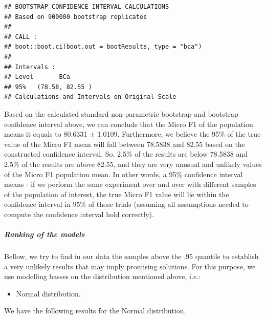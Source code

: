 \documentclass[
]{article}
\newenvironment{Shaded}{\begin{snugshade}}{\end{snugshade}}
\newcommand{\CommentTok}[1]{\textcolor[rgb]{0.56,0.35,0.01}{\textit{#1}}}
\newcommand{\DecValTok}[1]{\textcolor[rgb]{0.00,0.00,0.81}{#1}}
\newcommand{\FunctionTok}[1]{\textcolor[rgb]{0.00,0.00,0.00}{#1}}
\newcommand{\NormalTok}[1]{#1}
\newcommand{\OtherTok}[1]{\textcolor[rgb]{0.56,0.35,0.01}{#1}}
\newcommand{\SpecialCharTok}[1]{\textcolor[rgb]{0.00,0.00,0.00}{#1}}
\newcommand{\StringTok}[1]{\textcolor[rgb]{0.31,0.60,0.02}{#1}}
\providecommand{\tightlist}{%
  \setlength{\itemsep}{0pt}\setlength{\parskip}{0pt}}
\begin{document}
\begin{verbatim}
## BOOTSTRAP CONFIDENCE INTERVAL CALCULATIONS
## Based on 900000 bootstrap replicates
## 
## CALL : 
## boot::boot.ci(boot.out = bootResults, type = "bca")
## 
## Intervals : 
## Level       BCa          
## 95%   (78.58, 82.55 )  
## Calculations and Intervals on Original Scale
\end{verbatim}

Based on the calculated standard non-parametric bootstrap and bootstrap confidence interval above, we can conclude that the Micro F1 of the population means it equals to 80.6331 \(\pm\) 1.0109. Furthermore, we believe the 95\% of the true value of the Micro F1 mean will fall between 78.5838 and 82.55 based on the constructed confidence interval. So, 2.5\% of the results are below 78.5838 and 2.5\% of the results are above 82.55, and they are very unusual and unlikely values of the Micro F1 population mean. In other words, a 95\% confidence interval means - if we perform the same experiment over and over with different samples of the population of interest, the true Micro F1 value will lie within the confidence interval in 95\% of those trials (assuming all assumptions needed to compute the confidence interval hold correctly).

\hypertarget{ranking-of-the-models-2}{%
\subparagraph{Ranking of the models}\label{ranking-of-the-models-2}}

Bellow, we try to find in our data the samples above the .95 quantile to establish a very unlikely results that may imply promising solutions. For this purpose, we use modelling basses on the distribution mentioned above, i.e.:

\begin{itemize}
\tightlist
\item
  Normal distribution.
\end{itemize}

We have the following results for the Normal distribution.

\begin{Shaded}
\end{Shaded}
\end{document}
